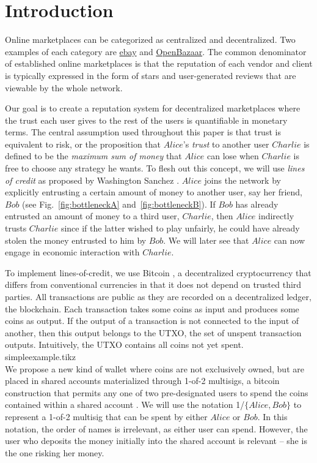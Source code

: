 \section{Introduction}
  Online marketplaces can be categorized as centralized and decentralized.
  Two examples of each category are \href{http://www.ebay.com}{ebay} and \href{https://openbazaar.org/}{OpenBazaar}.
  The common denominator of established online marketplaces is that the reputation of each vendor and client is typically
  expressed in the form of stars and user-generated reviews that are viewable by the whole network.

  Our goal is to create a reputation system for decentralized marketplaces where the trust each user gives to the rest of
  the users is quantifiable in monetary terms. The central assumption used throughout this paper is that trust is equivalent
  to risk, or the proposition that $Alice$'s \textit{trust} to another user $Charlie$ is defined to be the \textit{maximum sum
  of money} that $Alice$ can lose when $Charlie$ is free to choose any strategy he wants. To flesh out this concept, we will
  use \textit{lines of credit} as proposed by Washington Sanchez \cite{loc}. $Alice$ joins the network by explicitly
  entrusting a certain amount of money to another user, say her friend, $Bob$ (see Fig.~\ref{fig:bottleneckA}
  and~\ref{fig:bottleneckB}). If $Bob$ has already entrusted an amount of money to a third user, $Charlie$, then $Alice$
  indirectly trusts $Charlie$ since if the latter wished to play unfairly, he could have already stolen the money entrusted to
  him by $Bob$. We will later see that $Alice$ can now engage in economic interaction with $Charlie$.

  To implement lines-of-credit, we use Bitcoin \cite{bitcoin}, a decentralized cryptocurrency that differs from conventional
  currencies in that it does not depend on trusted third parties. All transactions are public as they are recorded on a
  decentralized ledger, the blockchain. Each transaction takes some coins as input and produces some coins as output. If the
  output of a transaction is not connected to the input of another, then this output belongs to the UTXO, the set of unspent
  transaction outputs. Intuitively, the UTXO contains all coins not yet spent.
  \medskip \ \\
  {simpleexample.tikz} \smallskip \ \\
  We propose a new kind of wallet where coins are not exclusively owned, but are placed in shared accounts materialized
  through 1-of-2 multisigs, a bitcoin construction that permits any one of two pre-designated users to spend the coins
  contained within a shared account \cite{masteringbitcoin}. We will use the notation 1/$\{Alice, Bob\}$ to represent a
  1-of-2 multisig that can be spent by either $Alice$ or $Bob$. In this notation, the order of names is irrelevant, as
  either user can spend. However, the user who deposits the money initially into the shared account is relevant -- she is the
  one risking her money.


